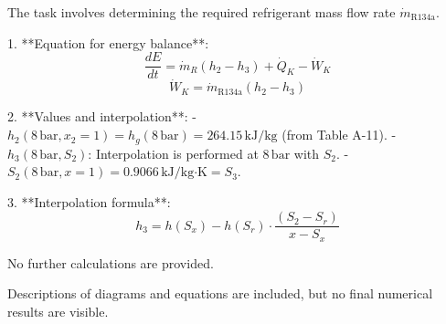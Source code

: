 The task involves determining the required refrigerant mass flow rate \( \dot{m}_{\text{R134a}} \).  

1. **Equation for energy balance**:  
   \[
   \frac{dE}{dt} = \dot{m}_R (h_2 - h_3) + \dot{Q}_K - \dot{W}_K  
   \]  
   \[
   \dot{W}_K = \dot{m}_{\text{R134a}} (h_2 - h_3)  
   \]  

2. **Values and interpolation**:  
   - \( h_2(8 \, \text{bar}, x_2 = 1) = h_g(8 \, \text{bar}) = 264.15 \, \text{kJ/kg} \) (from Table A-11).  
   - \( h_3(8 \, \text{bar}, S_2) \): Interpolation is performed at \( 8 \, \text{bar} \) with \( S_2 \).  
   - \( S_2(8 \, \text{bar}, x = 1) = 0.9066 \, \text{kJ/kg·K} = S_3 \).  

3. **Interpolation formula**:  
   \[
   h_3 = h(S_x) - h(S_r) \cdot \frac{(S_2 - S_r)}{x - S_x}  
   \]  

No further calculations are provided.  

Descriptions of diagrams and equations are included, but no final numerical results are visible.